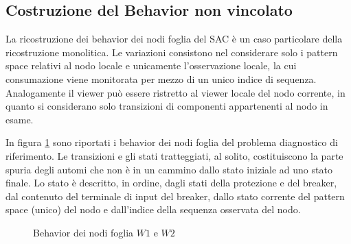 \subsection{Costruzione del Behavior non vincolato}
La ricostruzione dei behavior dei nodi foglia del SAC è un caso particolare della ricostruzione monolitica. Le variazioni consistono nel considerare solo i pattern space relativi al nodo locale e unicamente l'osservazione locale, la cui consumazione viene monitorata per mezzo di un unico indice di sequenza. Analogamente il viewer può essere ristretto al viewer locale del nodo corrente, in quanto si considerano solo transizioni di componenti appartenenti al nodo in esame.

\begin{ex}
In figura \ref{fig:bhv_leaves} sono riportati i behavior dei nodi foglia del problema diagnostico di riferimento. Le transizioni e gli stati tratteggiati, al solito, costituiscono la parte spuria degli automi che non è in un cammino dallo stato iniziale ad uno stato finale.
Lo stato è descritto, in ordine, dagli stati della protezione e del breaker, dal contenuto del terminale di input del breaker, dallo stato corrente del pattern space (unico) del nodo e dall'indice della sequenza osservata del nodo. 
\end{ex}

\begin{figure}[htbp]
\centering
{}
\hspace{5mm}
\caption{Behavior dei nodi foglia $W1$ e $W2$}
\label{fig:bhv_leaves}
\end{figure}

